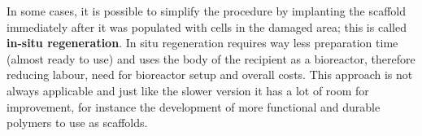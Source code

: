 In some cases, it is possible to simplify the procedure by implanting the scaffold immediately after it was populated with cells in the damaged area; this is called \textbf{in-situ regeneration}. In situ regeneration requires way less preparation time (almost ready to use) and uses the body of the recipient as a bioreactor, therefore reducing labour, need for bioreactor setup and overall costs. This approach is not always applicable and just like the slower version it has a lot of room for improvement, for instance the development of more functional and durable polymers to use as scaffolds.

